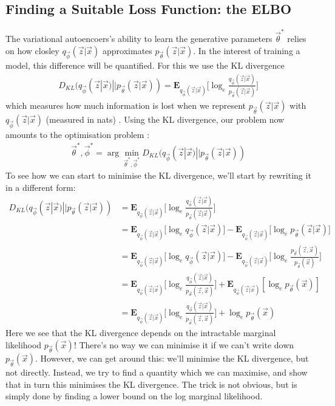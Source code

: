 \subsection{Finding a Suitable Loss Function: the ELBO}
The variational autoencoers's ability to learn the generative parameters $\vec{\theta}^*$ relies on how closley $q_{\vec{\phi}}(\vec{z}|\vec{x})$ approximates $p_{\vec{\theta}}(\vec{z}|\vec{x})$. In the interest of training a model, this difference will be quantified. For this we use the KL divergence
\begin{align}
D_{KL}(q_{\vec{\phi}}(\vec{z}|\vec{x})||p_{\vec{\theta}}(\vec{z}|\vec{x})) = \mathbf{E}_{q_{\vec{\phi}}(\vec{z}|\vec{x})}\bigg[\log_{e}\frac{q_{\vec{\phi}}(\vec{z}|\vec{x})}{p_{\vec{\theta}}(\vec{z}|\vec{x})}\bigg]
\end{align}
which measures how much information is lost when we represent $p_{\vec{\theta}}(\vec{z}|\vec{x})$ with $q_{\vec{\phi}}(\vec{z}|\vec{x})$ (measured in nats) \cite{Burnham2002}. Using the KL divergence, our problem now amounts to the optimisation problem \cite{Li2016}:
\begin{align}
\vec{\theta}^*, \vec{\phi}^* = \arg\min_{\vec{\theta}^*, \vec{\phi}^*} D_{KL}(q_{\vec{\phi}}(\vec{z}|\vec{x})||p_{\vec{\theta}}(\vec{z}|\vec{x}))
\label{eq:kl_divergence_optimisation_problem}
\end{align}
To see how we can start to minimise the KL divergence, we'll start by rewriting it in a different form:
\begin{align}
D_{KL}(q_{\vec{\phi}}(\vec{z}|\vec{x})||p_{\vec{\theta}}(\vec{z}|\vec{x})) &= \mathbf{E}_{q_{\vec{\phi}}(\vec{z}|\vec{x})}\bigg[\log_{e}\frac{q_{\vec{\phi}}(\vec{z}|\vec{x})}{p_{\vec{\theta}}(\vec{z}|\vec{x})}\bigg] \\
&= \mathbf{E}_{q_{\vec{\phi}}(\vec{z}|\vec{x})}\big[\log_{e}q_{\vec{\phi}}(\vec{z}|\vec{x})\big] - \mathbf{E}_{q_{\vec{\phi}}(\vec{z}|\vec{x})}\big[{\log_ep_{\vec{\theta}}(\vec{z}|\vec{x})}\big] \\
&= \mathbf{E}_{q_{\vec{\phi}}(\vec{z}|\vec{x})}\big[\log_{e}q_{\vec{\phi}}(\vec{z}|\vec{x})\big] - \mathbf{E}_{q_{\vec{\phi}}(\vec{z}|\vec{x})}\bigg[\log_e\frac{p_{\vec{\theta}}(\vec{z},\vec{x})}{p_{\vec{\theta}}(\vec{x})}\bigg] \\
&= \mathbf{E}_{q_{\vec{\phi}}(\vec{z}|\vec{x})}\bigg[\log_{e}\frac{q_{\vec{\phi}}(\vec{z}|\vec{x})}{{p_{\vec{\theta}}(\vec{z},\vec{x})}}\bigg] + \mathbf{E}_{q_{\vec{\phi}}(\vec{z}|\vec{x})}[\log_ep_{\vec{\theta}}(\vec{x})] \\
&= \mathbf{E}_{q_{\vec{\phi}}(\vec{z}|\vec{x})}\bigg[\log_{e}\frac{q_{\vec{\phi}}(\vec{z}|\vec{x})}{{p_{\vec{\theta}}(\vec{z},\vec{x})}}\bigg] + \log_ep_{\vec{\theta}}(\vec{x})
\label{eq:kl_divergence}
\end{align}
Here we see that the KL divergence depends on the intractable marginal likelihood $p_{\vec{\theta}}(\vec{x})$! There's no way we can minimise it if we can't write down $p_{\vec{\theta}}(\vec{x})$. However, we can get around this: we'll minimise the KL divergence, but not directly. Instead, we try to find a quantity which we can maximise, and show that in turn this minimises the KL divergence. The trick is not obvious, but is simply done by finding a lower bound on the log marginal likelihood.

